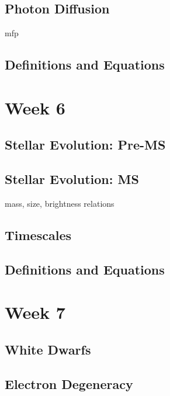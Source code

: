 \documentclass[a4paper,10pt]{article}
\begin{document}
\subsection{Photon Diffusion}
mfp

\subsection{Definitions and Equations}



\newpage
\section{Week 6}

\subsection{Stellar Evolution: Pre-MS}

\subsection{Stellar Evolution: MS}
mass, size, brightness relations

\subsection{Timescales}

\subsection{Definitions and Equations}

 

\newpage
\section{Week 7}

\subsection{White Dwarfs}

\subsection{Electron Degeneracy}
\end{document}
